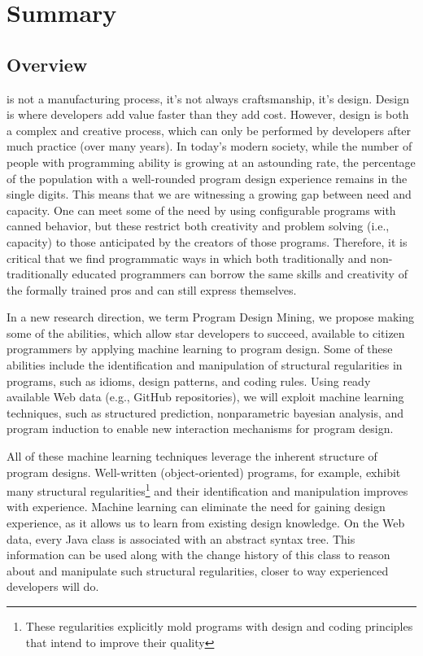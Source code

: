 \chapter{Summary}{}
\label{sec:intro}

\section*{Overview} %
\label{sec:overview}

 is not a manufacturing process, it's not 
always craftsmanship, it's design. Design is where developers add 
value faster than they add cost. However, design is both a complex 
and creative process, which can only be performed by developers after 
much practice (over many years). In today’s modern society, while the 
number of people with programming ability is growing at an astounding 
rate, the percentage of the population with a well-rounded program 
design experience remains in the single digits. This means that we are 
witnessing a growing gap between need and capacity. One can meet some of 
the need by using configurable programs with canned behavior, but these 
restrict both creativity and problem solving (i.e., capacity) to those 
anticipated by the creators of those programs. Therefore, it is critical 
that we find programmatic ways in which both traditionally and 
non-traditionally educated programmers can borrow the same skills and 
creativity of the formally trained pros and can still express themselves.

In a new research direction, we term Program Design Mining, we propose  
making some of the abilities, which allow star developers to succeed, 
available to citizen programmers by applying machine learning to program 
design. Some of these abilities include the identification and manipulation 
of structural regularities in programs, such as idioms, design patterns, 
and coding rules. Using ready available Web data (e.g., GitHub repositories), 
we will exploit machine learning techniques, such as structured prediction, 
nonparametric bayesian analysis, and program induction to enable new 
interaction mechanisms for program design.

All of these machine learning techniques leverage the inherent structure 
of program designs. Well-written (object-oriented) programs, for example, 
exhibit many structural regularities\footnote{These regularities explicitly 
mold programs with design and coding principles that intend to improve 
their quality} and their identification and manipulation improves with 
experience. Machine learning can eliminate the need for gaining design 
experience, as it allows us to learn from existing design knowledge. On 
the Web data, every Java class is associated with an abstract syntax tree. 
This information can be used along with the change history of this class to 
reason about and manipulate such structural regularities, closer to way 
experienced developers will do. 

